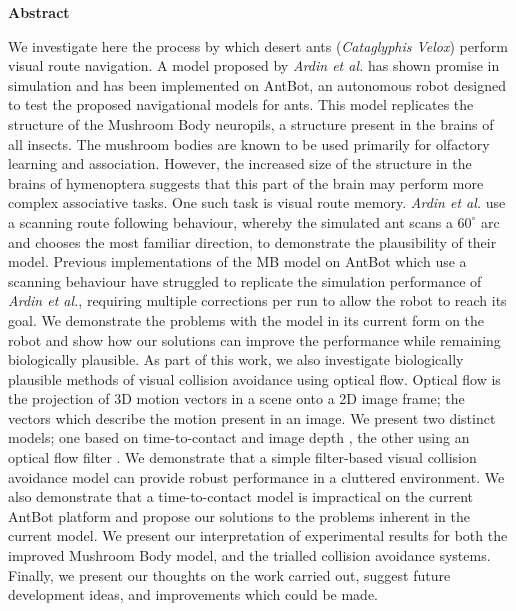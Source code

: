 \documentclass[a4paper,11pt,twoside,openright]{article}
\begin{document}
\newpage
\thispagestyle{empty}
\mbox{}
\newpage
\centering
{\LARGE\textbf{Abstract}}
\begin{flushleft}
  {\small We investigate here the process by which desert ants (\textit{Cataglyphis Velox})
    perform visual route navigation. A model proposed by \textit{Ardin et al.} \cite{Ardin2016} has shown
    promise in simulation and has been implemented on AntBot, an autonomous robot designed to test
    the proposed navigational models for ants. This model replicates the structure of the Mushroom Body
    neuropils, a structure present in the brains of all insects. The mushroom bodies are known
    to be used primarily for olfactory learning and association. However, the increased size of the structure in the brains
    of hymenoptera suggests that this part of the brain may perform more complex associative tasks.
    One such task is visual route memory. \textit{Ardin et al.} use a scanning route following behaviour,
    whereby the simulated ant scans a $60^{\circ}$ arc and chooses the most familiar direction, 
    to demonstrate the plausibility of their model. Previous implementations of the MB model on AntBot which
    use a scanning behaviour have struggled to replicate the simulation performance of \textit{Ardin et al.}, requiring multiple corrections per run to allow
    the robot to reach its goal. We demonstrate the problems with the model in its current form on the robot and
    show how our solutions can improve the performance while remaining biologically plausible.
    As part of this work, we also investigate biologically plausible methods of visual collision avoidance using optical
    flow. Optical flow is the projection of 3D motion vectors in a scene onto a 2D image frame;
    the vectors which describe the motion present in an image.
    We present two distinct models; one based on time-to-contact and image depth \cite{Low2005, Souhila2007}, the
    other using an optical flow filter \cite{Stewart2010, Scimeca2017}.
    We demonstrate that a simple filter-based visual collision avoidance model
    can provide robust performance in a cluttered environment. We also demonstrate that a time-to-contact model
    is impractical on the current AntBot platform and propose our solutions to the problems inherent in the current model.
    We present our interpretation of experimental results for both the improved Mushroom Body model, and the trialled
    collision avoidance systems.
    Finally, we present our thoughts on the work carried out, suggest future development ideas, and improvements
    which could be made.}
\end{flushleft}
\end{document}
